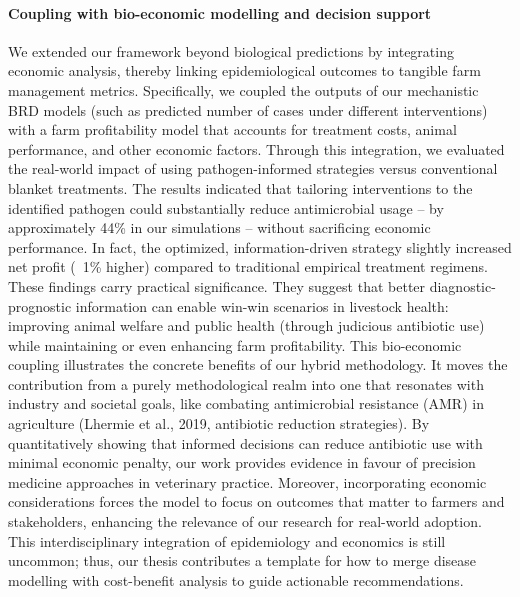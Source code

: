 \paragraph{Coupling with bio-economic modelling and decision support} We extended our framework beyond biological predictions by integrating economic analysis, thereby linking epidemiological outcomes to tangible farm management metrics. Specifically, we coupled the outputs of our mechanistic BRD models (such as predicted number of cases under different interventions) with a farm profitability model that accounts for treatment costs, animal performance, and other economic factors. Through this integration, we evaluated the real-world impact of using pathogen-informed strategies versus conventional blanket treatments. The results indicated that tailoring interventions to the identified pathogen could substantially reduce antimicrobial usage – by approximately 44\% in our simulations – without sacrificing economic performance. In fact, the optimized, information-driven strategy slightly increased net profit (~1\% higher) compared to traditional empirical treatment regimens. These findings carry practical significance. They suggest that better diagnostic-prognostic information can enable win-win scenarios in livestock health: improving animal welfare and public health (through judicious antibiotic use) while maintaining or even enhancing farm profitability. This bio-economic coupling illustrates the concrete benefits of our hybrid methodology. It moves the contribution from a purely methodological realm into one that resonates with industry and societal goals, like combating antimicrobial resistance (AMR) in agriculture (Lhermie et al., 2019, antibiotic reduction strategies). By quantitatively showing that informed decisions can reduce antibiotic use with minimal economic penalty, our work provides evidence in favour of precision medicine approaches in veterinary practice. Moreover, incorporating economic considerations forces the model to focus on outcomes that matter to farmers and stakeholders, enhancing the relevance of our research for real-world adoption. This interdisciplinary integration of epidemiology and economics is still uncommon; thus, our thesis contributes a template for how to merge disease modelling with cost-benefit analysis to guide actionable recommendations.

